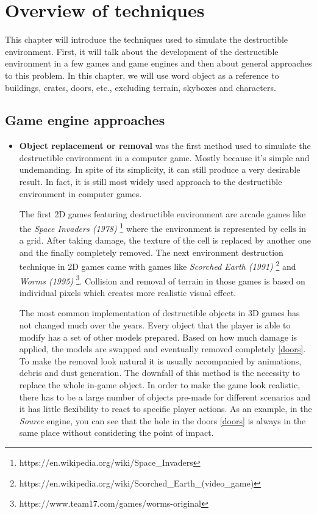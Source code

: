 \chapter{Overview of techniques}
This chapter will introduce the techniques used to simulate the destructible environment. First, it will talk about the development of the destructible environment in a few games and game engines and then about general approaches to this problem. In this chapter, we will use word object as a reference to buildings, crates, doors, etc., excluding terrain, skyboxes and characters.

\section{Game engine approaches}
\begin{itemize}
\item \textbf{Object replacement or removal} was the first method used to simulate the destructible environment in a computer game. Mostly because it's simple and undemanding. In spite of its simplicity, it can still produce a very desirable result. In fact, it is still most widely used approach to the destructible environment in computer games.

The first 2D games featuring destructible environment are arcade games like the \emph{Space Invaders (1978)} \footnote{https://en.wikipedia.org/wiki/Space\_Invaders} where the environment is represented by cells in a grid. After taking damage, the texture of the cell is replaced by another one and the finally completely removed. The next environment destruction technique in 2D games came with games like \emph{Scorched Earth (1991)} \footnote{https://en.wikipedia.org/wiki/Scorched\_Earth\_(video\_game)} and \emph{Worms (1995)} \footnote{https://www.team17.com/games/worms-original}. Collision and removal of terrain in those games is based on individual pixels which creates more realistic visual effect.

The most common implementation of destructible objects in 3D games has not changed much over the years. Every object that the player is able to modify has a set of other models prepared. Based on how much damage is applied, the models are swapped and eventually removed completely \ref{doors}. To make the removal look natural it is usually accompanied by animations, debris and dust generation. The downfall of this method is the necessity to replace the whole in-game object. In order to make the game look realistic, there has to be a large number of objects pre-made for different scenarios and it has little flexibility to react to specific player actions. As an example, in the \emph{Source} engine, you can see that the hole in the doors \ref{doors} is always in the same place without considering the point of impact.



\end{itemize}
